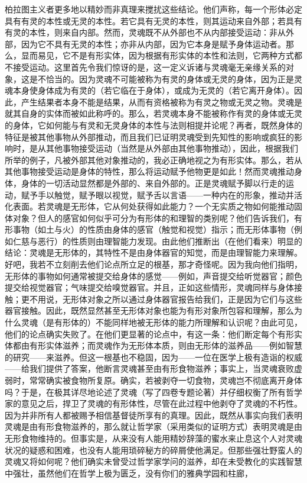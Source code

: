 柏拉图主义者更多地以精妙而非真理来搅扰这些结论。他们声称，每一个形体必定具有有灵的本性或无灵的本性。若它具有无灵的本性，则其运动来自外部；若具有有灵的本性，则来自内部。然而，灵魂既不从外部也不从内部接受运动：非从外部，因为它不具有无灵的本性；亦非从内部，因为它本身是赋予身体运动者。那么，显而易见，它不是有形实体，因为根据有形实体的本性和法则，它两种方式都不接受运动。这里首先令我们惊讶的是，这一定义诉诸与灵魂毫无亲缘关系的对象，这是不恰当的。因为灵魂不可能被称为有灵的身体或无灵的身体，因为正是灵魂本身使身体成为有灵的（若它临在于身体），或成为无灵的（若它离开身体）。因此，产生结果者本身不能是结果，从而有资格被称为有灵之物或无灵之物。灵魂是就其自身的实体而被如此称呼的。那么，若灵魂本身不能被称作有灵的身体或无灵的身体，它如何能与有灵和无灵身体的本性与法则相提并论呢？再者，既然身体的特征是被其他事物从外部推动，而且我们已证明灵魂受到先知性的影响或疯狂的影响时，是从其他事物接受运动（当然是从外部由其他事物推动），因此，根据我们所举的例子，凡被外部其他对象推动的，我必正确地视之为有形实体。那么，若从其他事物接受运动是身体的特性，那么将运动赋予他物更是如此！然而灵魂推动身体，身体的一切活动显然都是外部的、来自外部的。正是灵魂赋予脚以行走的运动，赋予手以触觉，赋予眼以视觉，赋予舌以言语——一种内在的形象，推动并活化表面。若灵魂是无形体，它从何处获得如此能力？一个无实质之物如何能推动固体对象？但人的感官如何似乎可分为有形体的和理智的类别呢？他们告诉我们，有形事物（如土与火）的性质由身体的感官（触觉和视觉）指示；而无形体事物（例如仁慈与恶行）的性质则由理智能力发现。由此他们推断出（在他们看来）明显的结论：灵魂是无形体的，其特性不是由身体器官的知觉，而是由理智能力来理解。好吧，我若不立刻削去他们论点所立足的根基，那才奇怪呢。因为我向他们指明，无形体的事物如何通常被提交给身体的感觉——例如，声音提交给听觉器官；颜色提交给视觉器官；气味提交给嗅觉器官。并且，正如这些情形，灵魂同样与身体接触；更不用说，无形体对象之所以通过身体器官报告给我们，正是因为它们与这些器官接触。因此，既然显然甚至无形体对象也能为有形对象所包容和理解，那么为什么灵魂（是有形体的）不能同样地被无形体的能力所理解和认识呢？由此可见，他们的论点确实失败了。在他们更显著的论点中，有这一条：他们断定每个有形实体都由有形实体滋养；而灵魂作为无形体本质，则由无形体的滋养品——例如智慧的研究——来滋养。但这一根基也不稳固，因为——一位在医学上极有造诣的权威——给我们提供了答案，他断言灵魂甚至由有形食物滋养；事实上，当灵魂衰败虚弱时，常常确实被食物所复原。确实，若被剥夺一切食物，灵魂岂不彻底离开身体吗？于是，在极其详尽地论述了灵魂（写了四卷专题论著）并仔细权衡了所有哲学家的意见之后，捍卫了灵魂的有形体性，尽管在此过程中他剥夺了灵魂的不朽性。因为并非所有人都被赐予相信基督徒所享有的真理。因此，既然从事实向我们表明灵魂是由有形食物滋养的，那么就让哲学家（采用类似的证明方式）表明灵魂是由无形食物维持的。但事实是，从来没有人能用精妙辞藻的蜜水来止息这个人对灵魂状况的疑惑和困难，也没有人能用琐碎秘方的碎屑使他满足。但那些强壮野蛮人的灵魂又将如何呢？他们确实未曾受过哲学家学问的滋养，却在未受教化的实践智慧中强壮，虽然他们在哲学上极为匮乏，没有你们的雅典学园和柱廊，